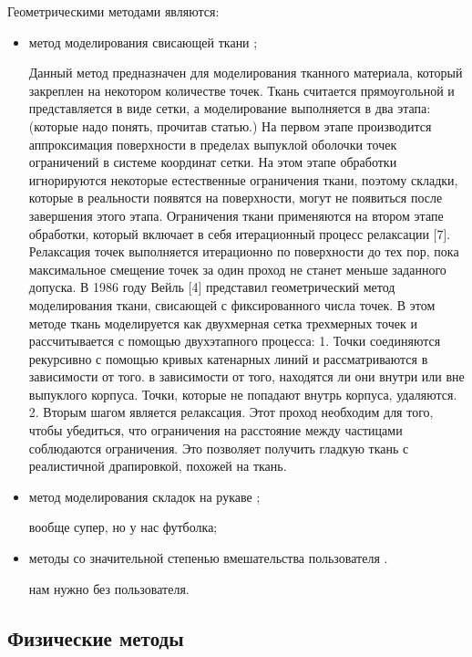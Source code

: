 Геометрическими методами являются:
\begin{itemize}[left=\parindent]
    \item метод моделирования свисающей ткани \cite{bib08};

        Данный метод предназначен для моделирования тканного материала, который
        закреплен на некотором количестве точек. Ткань считается прямоугольной
        и представляется в виде сетки, а моделирование выполняется в два этапа:
        (которые надо понять, прочитав статью.)
        На первом этапе производится аппроксимация поверхности в пределах выпуклой оболочки точек ограничений в системе координат сетки. На этом этапе обработки игнорируются некоторые естественные ограничения ткани, поэтому складки, которые в реальности появятся на поверхности, могут не появиться после завершения этого этапа. Ограничения ткани применяются на втором этапе обработки, который включает в себя итерационный процесс релаксации [7]. Релаксация точек выполняется итерационно по поверхности до тех пор, пока максимальное смещение точек за один проход не станет меньше заданного допуска.
        В 1986 году Вейль [4] представил геометрический метод моделирования ткани, свисающей с фиксированного числа точек. В этом методе ткань моделируется как двухмерная сетка трехмерных точек и рассчитывается с помощью двухэтапного процесса:
1. Точки соединяются рекурсивно с помощью кривых катенарных линий и рассматриваются в зависимости от того. в зависимости от того, находятся ли они внутри или вне выпуклого корпуса. Точки, которые не попадают внутрь корпуса, удаляются.
2. Вторым шагом является релаксация. Этот проход необходим для того, чтобы убедиться, что ограничения на расстояние
между частицами соблюдаются ограничения. Это позволяет получить гладкую
ткань с реалистичной драпировкой, похожей на ткань.

    \item метод моделирования складок на рукаве \cite{bib07};

        вообще супер, но у нас футболка;

    \item методы со значительной степенью вмешательства пользователя
        \cite{bib09}\cite{bib10}.

        нам нужно без пользователя.

\end{itemize}

\subsection{Физические методы}

